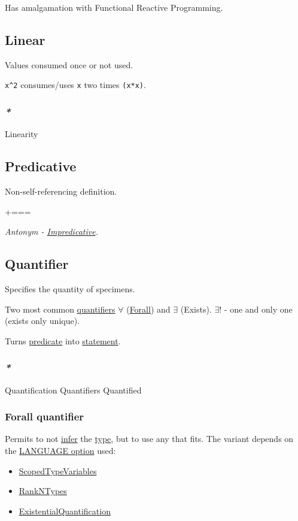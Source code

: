 \documentclass[a4paper,14pt,oneside]{book}
\newcommand{\additional}{{\scriptsize +===}}    %
\begin{document}
Has amalgamation with Functional Reactive Programming.

\subsection{\label{orgb2460d9}Linear}
\label{sec:orga61ac3a}
Values consumed once or not used.

\texttt{x\textasciicircum{}2} consumes/uses \texttt{x} two times \texttt{(x*x)}.

\subsubsection{\emph{*}}
\label{sec:org4801a49}

\label{orge6b3b25}Linearity

\subsection{\label{orgc356d86}Predicative}
\label{sec:org7d440e7}
Non-self-referencing definition.

\additional

\emph{Antonym - \hyperref[orgfb0695a]{Impredicative}.}

\subsection{\label{org7aeeefd}Quantifier}
\label{sec:orga1aad5d}
Specifies the quantity of specimens.

Two most common \hyperref[org6734a65]{quantifiers} \(\forall\) (\hyperref[orgb59fd23]{Forall}) and \(\exists\) (Exists).
\(\exists !\) - one and only one (exists only unique).

Turns \hyperref[org68eab70]{predicate} into \hyperref[orgb39efd8]{statement}.

\subsubsection{\emph{*}}
\label{sec:org089f116}

\label{orgf85457f}Quantification
\label{org6734a65}Quantifiers
\label{orgf00d307}Quantified

\subsubsection{\label{orgacfe1fe}Forall quantifier}
\label{sec:org29ffa51}
Permits to not \hyperref[org2f48046]{infer} the \hyperref[org02a9d3a]{type}, but to use any that fits. The variant depends on the \hyperref[org06ddd06]{LANGUAGE option} used:
\begin{itemize}
\item \hyperref[org897423d]{ScopedTypeVariables}
\item \hyperref[orgd6349d0]{RankNTypes}
\item \hyperref[orgf85fee3]{ExistentialQuantification}
\end{itemize}
\end{document}
